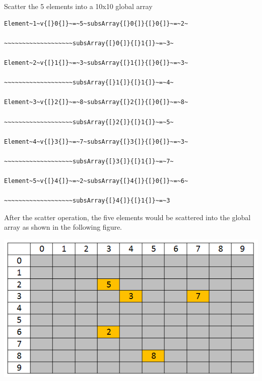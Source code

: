 Scatter the 5 elements into a 10x10 global array
\begin{verbatim}
Element~1~v{[}0{]}~=~5~subsArray{[}0{]}{[}0{]}~=~2~

~~~~~~~~~~~~~~~~~~~subsArray{[}0{]}{[}1{]}~=~3~

Element~2~v{[}1{]}~=~3~subsArray{[}1{]}{[}0{]}~=~3~

~~~~~~~~~~~~~~~~~~~subsArray{[}1{]}{[}1{]}~=~4~

Element~3~v{[}2{]}~=~8~subsArray{[}2{]}{[}0{]}~=~8~

~~~~~~~~~~~~~~~~~~~subsArray{[}2{]}{[}1{]}~=~5~

Element~4~v{[}3{]}~=~7~subsArray{[}3{]}{[}0{]}~=~3~

~~~~~~~~~~~~~~~~~~~subsArray{[}3{]}{[}1{]}~=~7~

Element~5~v{[}4{]}~=~2~subsArray{[}4{]}{[}0{]}~=~6~

~~~~~~~~~~~~~~~~~~~subsArray{[}4{]}{[}1{]}~=~3
\end{verbatim}
After the scatter operation, the five elements would be scattered
into the global array as shown in the following figure. 

\includegraphics[scale=0.6]{scatter-GA}

